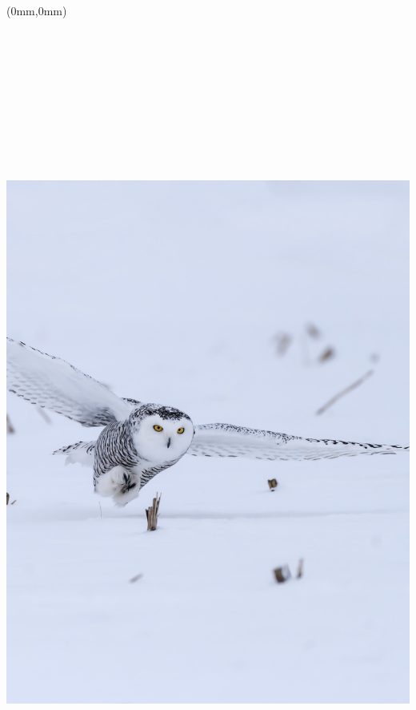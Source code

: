 \documentclass[letterpaper,11pt]{memoir}
\begin{document}
\frontmatter

\pagestyle{empty}

\textblockorigin{0mm}{0mm}
\setlength{\parindent}{0mm}

\begin{textblock*}{8.5in}(0mm,0mm)
  \includegraphics[height=11in,keepaspectratio=true]{Fotolia_99831160-avant.jpg} \\
\end{textblock*}
\end{document}
